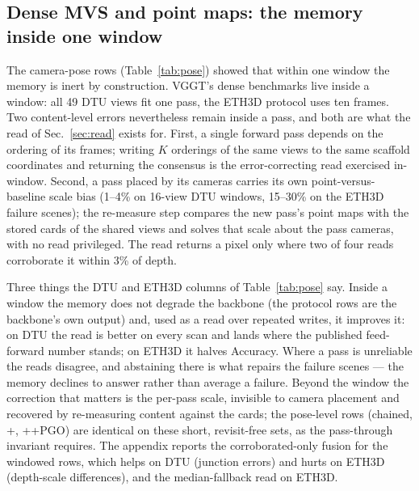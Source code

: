 \subsection{Dense MVS and point maps: the memory inside one window}
\label{sec:mvs}

The camera-pose rows (Table~\ref{tab:pose}) showed that within one window
the memory is inert by construction. VGGT's dense benchmarks live inside a
window: all 49 DTU views fit one pass, the ETH3D protocol uses ten frames.
Two content-level errors nevertheless remain inside a pass, and both are
what the read of Sec.~\ref{sec:read} exists for. First, a single forward
pass depends on the ordering of its frames; writing $K$ orderings of the
same views to the same scaffold coordinates and returning the consensus is
the error-correcting read exercised in-window. Second, a pass placed by its
cameras carries its own point-versus-baseline scale bias (1--4\% on 16-view
DTU windows, 15--30\% on the ETH3D failure scenes); the re-measure step
compares the new pass's point maps with the stored cards of the shared
views and solves that scale about the pass cameras, with no read
privileged. The read returns a pixel only where two of four reads
corroborate it within 3\% of depth.



Three things the DTU and ETH3D columns of Table~\ref{tab:pose} say. Inside a window the memory does not degrade
the backbone (the protocol rows are the backbone's own output) and, used
as a read over repeated writes, it improves it: on DTU the read is
better on every scan and lands where the published feed-forward number
stands; on ETH3D it halves Accuracy. Where a pass is unreliable the reads
disagree, and abstaining there is what repairs the failure scenes --- the
memory declines to answer rather than average a failure. Beyond the window
the correction that matters is the per-pass scale, invisible to camera
placement and recovered by re-measuring content against the cards; the
pose-level rows (chained, +\smr{}, +\smr{}+PGO) are identical on these
short, revisit-free sets, as the pass-through invariant requires. The
appendix reports the corroborated-only fusion for the windowed rows,
which helps on DTU (junction errors) and hurts on ETH3D (depth-scale
differences), and the median-fallback read on ETH3D.

